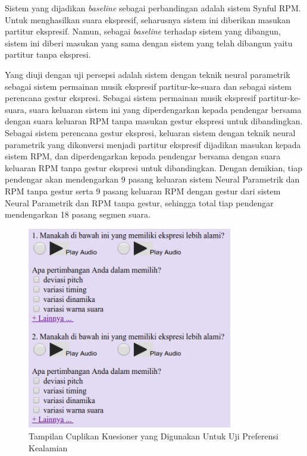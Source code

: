 Sistem yang dijadikan \textit{baseline} sebagai perbandingan adalah sistem Synful RPM. Untuk menghasilkan suara ekspresif, seharusnya sistem ini diberikan masukan partitur ekspresif. Namun, sebagai \textit{baseline} terhadap sistem yang dibangun, sistem ini diberi masukan yang sama dengan sistem yang telah dibangun yaitu partitur tanpa ekspresi.

Yang diuji dengan uji persepsi adalah sistem dengan teknik neural parametrik sebagai sistem permainan musik ekspresif partitur-ke-suara dan sebagai sistem perencana gestur ekspresi. Sebagai sistem permainan musik ekspresif partitur-ke-suara, suara keluaran sistem ini yang diperdengarkan kepada pendengar bersama dengan suara keluaran RPM tanpa masukan gestur ekspresi untuk dibandingkan. Sebagai sistem perencana gestur ekspresi, keluaran sistem dengan teknik neural parametrik yang dikonversi menjadi partitur ekspresif dijadikan masukan kepada sistem RPM, dan diperdengarkan kepada pendengar bersama dengan suara keluaran RPM tanpa gestur ekspresi untuk dibandingkan. Dengan demikian, tiap pendengar akan mendengarkan 9 pasang keluaran sistem Neural Parametrik dan RPM tanpa gestur serta 9 pasang keluaran RPM dengan gestur dari sistem Neural Parametrik dan RPM tanpa gestur, sehingga total tiap pendengar mendengarkan 18 pasang segmen suara.

\begin{figure}
\centering
    \includegraphics[width=0.8\textwidth]{resources/questionnaire_screenshot.png}
    \caption{Tampilan Cuplikan Kuesioner yang Digunakan Untuk Uji Preferensi Kealamian}\label{fig-questionnaire-sample}
\end{figure}

